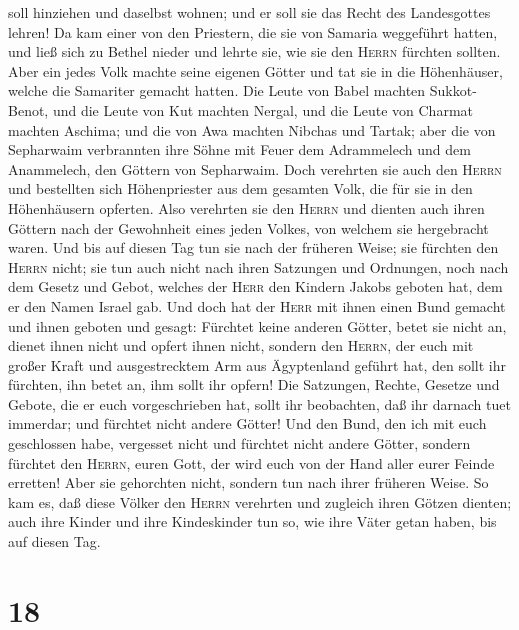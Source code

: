 soll hinziehen und daselbst wohnen; und er soll sie das Recht des
Landesgottes lehren!  Da kam einer von den Priestern, die
sie von Samaria weggeführt hatten, und ließ sich zu Bethel nieder und
lehrte sie, wie sie den \textsc{Herrn} fürchten sollten. 
Aber ein jedes Volk machte seine eigenen Götter und tat sie in die
Höhenhäuser, welche die Samariter gemacht hatten.  Die
Leute von Babel machten Sukkot-Benot, und die Leute von Kut machten
Nergal, und die Leute von Charmat machten Aschima;  und
die von Awa machten Nibchas und Tartak; aber die von Sepharwaim
verbrannten ihre Söhne mit Feuer dem Adrammelech und dem Anammelech, den
Göttern von Sepharwaim.  Doch verehrten sie auch den
\textsc{Herrn} und bestellten sich Höhenpriester aus dem gesamten Volk,
die für sie in den Höhenhäusern opferten.  Also verehrten
sie den \textsc{Herrn} und dienten auch ihren Göttern nach der
Gewohnheit eines jeden Volkes, von welchem sie hergebracht waren.
 Und bis auf diesen Tag tun sie nach der früheren Weise;
sie fürchten den \textsc{Herrn} nicht; sie tun auch nicht nach ihren
Satzungen und Ordnungen, noch nach dem Gesetz und Gebot, welches der
\textsc{Herr} den Kindern Jakobs geboten hat, dem er den Namen Israel
gab.  Und doch hat der \textsc{Herr} mit ihnen einen Bund
gemacht und ihnen geboten und gesagt: Fürchtet keine anderen Götter,
betet sie nicht an, dienet ihnen nicht und opfert ihnen nicht,
 sondern den \textsc{Herrn}, der euch mit großer Kraft
und ausgestrecktem Arm aus Ägyptenland geführt hat, den sollt ihr
fürchten, ihn betet an, ihm sollt ihr opfern!  Die
Satzungen, Rechte, Gesetze und Gebote, die er euch vorgeschrieben hat,
sollt ihr beobachten, daß ihr darnach tuet immerdar; und fürchtet nicht
andere Götter!  Und den Bund, den ich mit euch
geschlossen habe, vergesset nicht und fürchtet nicht andere Götter,
 sondern fürchtet den \textsc{Herrn}, euren Gott, der
wird euch von der Hand aller eurer Feinde erretten!  Aber
sie gehorchten nicht, sondern tun nach ihrer früheren Weise.
 So kam es, daß diese Völker den \textsc{Herrn} verehrten
und zugleich ihren Götzen dienten; auch ihre Kinder und ihre
Kindeskinder tun so, wie ihre Väter getan haben, bis auf diesen Tag.

\hypertarget{section-17}{%
\section{18}\label{section-17}}

